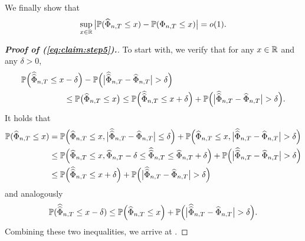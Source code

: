 \documentclass[12pt]{article}
\makeatletter
\renewcommand{\eqref}[1]{\tagform@{\ref{#1}}}
\makeatother
\begin{document}
We finally show that 
\begin{equation}\label{eq:claim:step5}
\sup_{x \in \mathbb{R}} \big| \mathbb{P}(\widehat{\Phi}_{n, T} \le x) - \mathbb{P}(\Phi_{n,T} \le x) \big| = o(1).
\end{equation}
\begin{proof}[\textnormal{\textbf{Proof of (\ref{eq:claim:step5}).}}]
To start with, we verify that for any $x \in \mathbb{R}$ and any $\delta > 0$, 
\begin{align}
\mathbb{P}\Big( \widehat{\widehat{\Phi}}_{n,T} \le x & - \delta\Big) - \mathbb{P} \Big(\big|\widehat{\widehat{\Phi}}_{n,T} - \widehat{\Phi}_{n,T}\big| > \delta \Big) \nonumber \\
 & \le \mathbb{P}\big(\widehat{\Phi}_{n, T} \le x\big) \le\mathbb{P}\Big(\widehat{\widehat{\Phi}}_{n,T} \le x + \delta\Big) + \mathbb{P} \Big(\big|\widehat{\widehat{\Phi}}_{n,T} - \widehat{\Phi}_{n,T}\big| > \delta \Big). \label{eq:lemmaA-step1}
\end{align}
It holds that
\begin{align*} 
\mathbb{P}(\widehat{\Phi}_{n, T} \le x) &= \mathbb{P} \Big(\widehat{\Phi}_{n, T} \le x, \big|\widehat{\widehat{\Phi}}_{n,T} - \widehat{\Phi}_{n,T}\big| \le \delta \Big) + \mathbb{P} \Big(\widehat{\Phi}_{n, T} \le x, \big|\widehat{\widehat{\Phi}}_{n,T} - \widehat{\Phi}_{n,T}\big| > \delta \Big) \\
& \le  \mathbb{P} \Big(\widehat{\Phi}_{n, T} \le x, \widehat{\Phi}_{n,T} - \delta \le \widehat{\widehat{\Phi}}_{n,T} \le \widehat{\Phi}_{n,T} + \delta \Big) + \mathbb{P} \Big(\big|\widehat{\widehat{\Phi}}_{n,T} - \widehat{\Phi}_{n,T}\big| > \delta \Big) \\
& \le  \mathbb{P} \Big(\widehat{\widehat{\Phi}}_{n,T} \le x + \delta \Big) + \mathbb{P} \Big(\big|\widehat{\widehat{\Phi}}_{n,T} - \widehat{\Phi}_{n,T}\big| > \delta \Big)
\end{align*}
and analogously 
\begin{align*} \mathbb{P}(\widehat{\widehat{\Phi}}_{n, T} \le x - \delta)  \le  \mathbb{P} \Big(\widehat{\Phi}_{n,T} \le x \Big) + \mathbb{P} \Big(\big|\widehat{\widehat{\Phi}}_{n,T} - \widehat{\Phi}_{n,T}\big| > \delta \Big).
\end{align*}
Combining these two inequalities, we arrive at \eqref{eq:lemmaA-step1}.



\end{proof}
\end{document}
